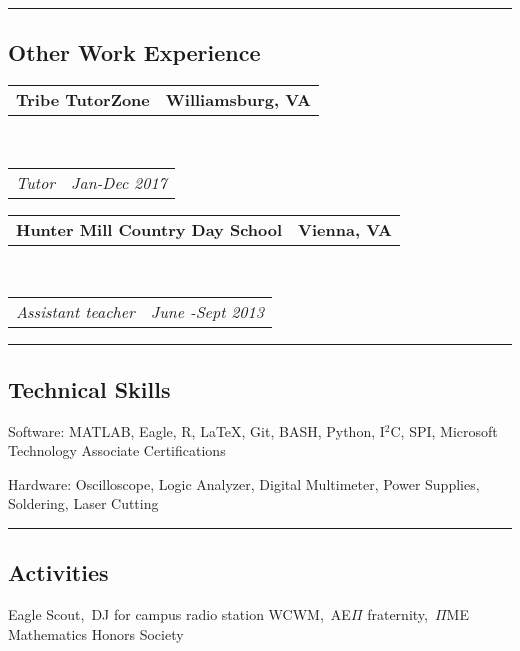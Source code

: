 \documentclass[10pt,letterpaper]{article}
\makeatletter
\newenvironment{indentsection}[1]%
{\begin{list}{}%
	{\setlength{\leftmargin}{#1}}%
	\item[]%
}
{\end{list}}
\newcommand{\headerrow}[2]
{\begin{tabular*}{\linewidth}{l@{\extracolsep{\fill}}r}
	#1 &
	#2 \\
\end{tabular*}}
\makeatother
\begin{document}
\hrule
\vspace{-0.4em}
\subsection*{Other Work Experience}

	\headerrow
		{\textbf{Tribe TutorZone}}
		{\textbf{Williamsburg, VA}}
	\\
	\headerrow
		{\emph{Tutor}}
		{\emph{Jan-Dec 2017}}
	\headerrow
		{\textbf{Hunter Mill Country Day School}}
		{\textbf{Vienna, VA}}
	\\
	\headerrow
		{\emph{Assistant teacher}}
		{\emph{June -Sept 2013}}
	
\hrule
\vspace{-0.4em}
\subsection*{Technical Skills}

\begin{description*}
	\item[Software:]
	MATLAB, Eagle, R, \LaTeX, Git, BASH, Python, I$^2$C, SPI, Microsoft Technology Associate Certifications
	\item[Hardware:]
	Oscilloscope, Logic Analyzer, Digital Multimeter, Power Supplies, Soldering, Laser Cutting
\end{description*}

\hrule
\vspace{-0.4em}
\subsection*{Activities}
\indent Eagle Scout,\, DJ for campus radio station WCWM,\, AE$\Pi$ fraternity,\, $\Pi$ME Mathematics Honors Society
\end{document}
